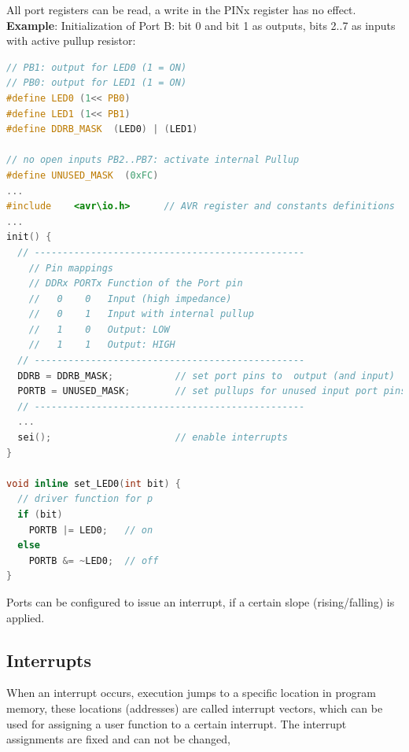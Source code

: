 All port registers can be read, a write in the PINx register has no effect.\\

\textbf{Example}:  Initialization of Port B: bit 0 and bit 1 as outputs, bits 2..7 as inputs with active  pullup resistor:\\

\begin{lstlisting}[style=mystyle, language=c]
// PB1: output for LED0 (1 = ON)
// PB0: output for LED1 (1 = ON)
#define LED0 (1<< PB0)
#define LED1 (1<< PB1)
#define DDRB_MASK  (LED0) | (LED1)

// no open inputs PB2..PB7: activate internal Pullup
#define UNUSED_MASK  (0xFC)
...
#include	<avr\io.h>		// AVR register and constants definitions
...
init() {
  // ------------------------------------------------
	// Pin mappings
	// DDRx PORTx Function of the Port pin
	//   0    0   Input (high impedance)
	//   0    1   Input with internal pullup
	//   1    0   Output: LOW
	//   1    1   Output: HIGH
  // ------------------------------------------------
  DDRB = DDRB_MASK;           // set port pins to  output (and input)
  PORTB = UNUSED_MASK;        // set pullups for unused input port pins 
  // ------------------------------------------------
  ...
  sei();                      // enable interrupts
}

void inline set_LED0(int bit) {
  // driver function for p
  if (bit)
	PORTB |= LED0;   // on
  else 
	PORTB &= ~LED0;  // off
}
\end{lstlisting}

Ports can be configured to issue an interrupt, if a certain slope (rising/falling) is applied.

\subsection{Interrupts}

When an interrupt occurs, execution jumps to a specific location in program memory, these locations (addresses) are called interrupt vectors, which can be used for assigning a user function to a certain interrupt. The interrupt assignments are fixed and can not be changed, 
\newpage

